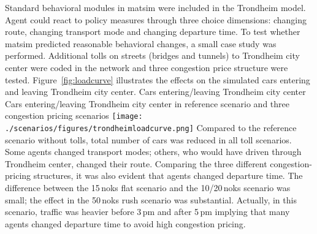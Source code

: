 Standard behavioral modules in \gls{matsim} were included in the Trondheim model. Agent could react to policy measures through three choice dimensions: changing route, changing transport mode and changing departure time. To test whether \gls{matsim} predicted reasonable behavioral changes, a small case study was performed. Additional tolls on streets (bridges and tunnels) to Trondheim city center were coded in the network and three congestion price structure were tested. Figure~\ref{fig:loadcurve} illustrates the effects on the simulated cars entering and leaving Trondheim city center. 
%
\createfigure%
{Cars entering/leaving Trondheim city center}%
{Cars entering/leaving Trondheim city center in reference scenario and three congestion pricing scenarios \citep[source][]{Bockemuehl_TechRep_UH_2014}}%
{\label{fig:loadcurve}}%
{\texttt{[image: ./scenarios/figures/trondheimloadcurve.png]}}%
{}
%
Compared to the reference scenario without tolls, total number of cars was reduced in all toll scenarios. Some agents changed transport modes; others, who would have driven through Trondheim center, changed their route. Comparing the three different congestion-pricing structures, it was also evident that agents changed departure time. The difference between the 15\,\glspl{nok} flat scenario and the 10/20\,\glspl{nok} scenario was small; the effect in the 50\,\glspl{nok} rush scenario was substantial. Actually, in this scenario, traffic was heavier before 3\,pm and after 5\,pm implying that many agents changed departure time to avoid high congestion pricing.  












